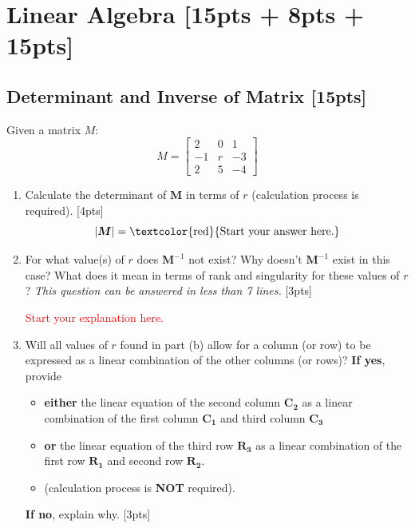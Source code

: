 \documentclass{article}
\begin{document}
\newpage

\section{Linear Algebra [15pts + 8pts + 15pts]}
\subsection{Determinant and Inverse of Matrix [15pts]}
Given a matrix $M$:
$$M = \begin{bmatrix} 
    2 & 0 & 1 \\ 
    -1 & r & -3 \\
    2 & 5 & -4
\end{bmatrix}$$
\begin{enumerate}[label=(\alph*)]
    \item Calculate the determinant of $\boldsymbol{M}$ in terms of $r$ (calculation process is required). [4pts]
    $$|\boldsymbol{M}| = \text{\textcolor{red}{Start your answer here.}} $$

    \item For what value(s) of $r$ does $\boldsymbol{M}^{-1}$ not exist? Why doesn't $\boldsymbol{M}^{-1}$ exist in this case? What does it mean in terms of rank and singularity for these values of $r$? \textit{This question can be answered in less than 7 lines. } [3pts]
    
    \textcolor{red}{Start your explanation here.} %
    
    \item Will all values of $r$ found in part (b) allow for a column (or row) to be expressed as a linear combination of the other columns (or rows)? \textbf{If yes}, provide
    \begin{itemize}
        \item \textbf{either} the linear equation of the second column $\boldsymbol{C_2}$ as a linear combination of the first column $\boldsymbol{C_1}$ and third column $\boldsymbol{C_3}$
        \item \textbf{or} the linear equation of the third row $\boldsymbol{R_3}$ as a linear combination of the first row $\boldsymbol{R_1}$ and second row $\boldsymbol{R_2}$.
        \item (calculation process is \textbf{NOT} required).
    \end{itemize}
    \textbf{If no}, explain why. [3pts]



\end{enumerate}
\end{document}
